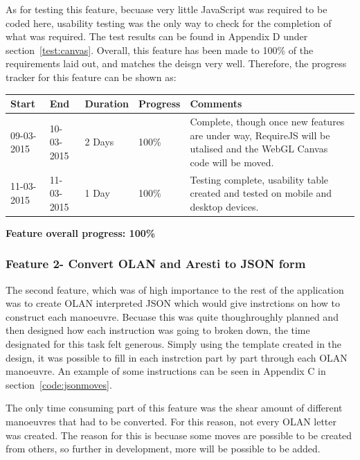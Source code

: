 As for testing this feature, becuase very little JavaScript was required to be coded here, usability testing was the only way to check for the completion of what was required. The test results can be found in Appendix D under section~\ref{test:canvas}. Overall, this feature has been made to 100\% of the requirements laid out, and matches the deisgn very well. Therefore, the progress tracker for this feature can be shown as:

\begin{table}[h]
\begin{tabular}{|l|l|l|l|p{7cm}|}
\hline
\textbf{Start} & \textbf{End} & \textbf{Duration} & \textbf{Progress} & \textbf{Comments}                                                                                                     \\ \hline
09-03-2015     & 10-03-2015   & 2 Days            & 100\%             & Complete, though once new features are under way, RequireJS will be utalised and the WebGL Canvas code will be moved. \\ \hline
11-03-2015     & 11-03-2015   & 1 Day            & 100\%             & Testing complete, usability table created and tested on mobile and desktop devices.\\ \hline
\end{tabular}
\end{table}

\textbf{Feature overall progress: 100\%}

\subsubsection{Feature 2- Convert OLAN and Aresti to JSON form}
The second feature, which was of high importance to the rest of the application was to create OLAN interpreted JSON which would give instrctions on how to construct each manoeuvre. Becuase this was quite thoughroughly planned and then designed how each instruction was going to broken down, the time designated for this task felt generous. Simply using the template created in the design, it was possible to fill in each instrction part by part through each OLAN manoeuvre. An example of some instructions can be seen in Appendix C in section~\ref{code:jsonmoves}.

The only time consuming part of this feature was the shear amount of different manoeuvres that had to be converted. For this reason, not every OLAN letter was created. The reason for this is becuase some moves are possible to be created from others, so further in development, more will be possible to be added. 

